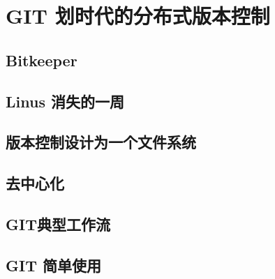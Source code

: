 \section{GIT 划时代的分布式版本控制\label{sec:git}}
\subsection{Bitkeeper}
\subsection{Linus 消失的一周}
\subsection{版本控制设计为一个文件系统}
\subsection{去中心化}
\subsection{GIT典型工作流}
\subsection{GIT 简单使用}



